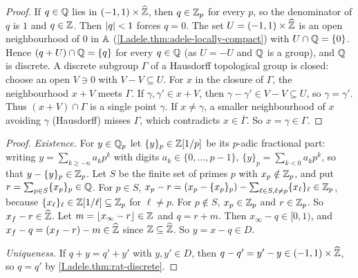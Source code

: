 \begin{theorem}[$\Q$ is discrete in $\A$]
\end{theorem}
\begin{proof}
If $q\in\mathbb{Q}$ lies in $(-1,1)\times\widehat{\mathbb{Z}}$, then $q\in\mathbb{Z}_p$ for every $p$, so the denominator of $q$ is $1$ and $q\in\mathbb{Z}$.
Then $\lvert q\rvert<1$ forces $q=0$. The set $U=(-1,1)\times\widehat{\mathbb{Z}}$ is an open neighbourhood of $0$ in $\A$
(\cref{I.adele.thm:adele-locally-compact}) with $U\cap\mathbb{Q}=\{0\}$. Hence $(q+U)\cap\mathbb{Q}=\{q\}$ for every $q\in\mathbb{Q}$ (as $U=-U$
and $\Q$ is a group), and $\Q$ is discrete. A discrete subgroup $\Gamma$ of a Hausdorff topological group is closed: choose an open
$V\ni0$ with $V-V\subseteq U$. For $x$ in the closure of $\Gamma$, the neighbourhood $x+V$ meets $\Gamma$. If
$\gamma,\gamma'\in x+V$, then $\gamma-\gamma'\in V-V\subseteq U$, so $\gamma=\gamma'$. Thus $(x+V)\cap\Gamma$ is a single
point $\gamma$. If $x\neq\gamma$, a smaller neighbourhood of $x$ avoiding $\gamma$ (Hausdorff) misses $\Gamma$, which
contradicts $x\in\overline\Gamma$. So $x=\gamma\in\Gamma$.
\end{proof}

\begin{theorem}
\end{theorem}
\begin{proof}
\emph{Existence.} For $y\in\mathbb{Q}_p$ let $\{y\}_p\in\mathbb{Z}[1/p]$ be its $p$-adic fractional part: writing $y=\sum_{k\ge-n}a_kp^k$ with digits
$a_k\in\{0,\dots,p-1\}$, $\{y\}_p=\sum_{k<0}a_kp^k$, so that $y-\{y\}_p\in\mathbb{Z}_p$. Let $S$ be the finite set of primes $p$ with $x_p\notin\mathbb{Z}_p$, and put
$r=\sum_{p\in S}\{x_p\}_p\in\mathbb{Q}$. For $p\in S$,
$x_p-r=(x_p-\{x_p\}_p)-\sum_{\ell\in S,\ell\neq p}\{x_\ell\}_\ell\in\mathbb{Z}_p$, because $\{x_\ell\}_\ell\in\mathbb{Z}[1/\ell]\subseteq\mathbb{Z}_p$
for $\ell\neq p$. For $p\notin S$, $x_p\in\mathbb{Z}_p$ and $r\in\mathbb{Z}_p$. So $x_f-r\in\widehat{\mathbb{Z}}$. Let $m=\lfloor x_\infty-r\rfloor\in\mathbb{Z}$
and $q=r+m$. Then $x_\infty-q\in[0,1)$, and $x_f-q=(x_f-r)-m\in\widehat{\mathbb{Z}}$ since $\mathbb{Z}\subseteq\widehat{\mathbb{Z}}$. So $y=x-q\in D$.

\emph{Uniqueness.} If $q+y=q'+y'$ with $y,y'\in D$, then $q-q'=y'-y\in(-1,1)\times\widehat{\mathbb{Z}}$, so $q=q'$ by
\cref{I.adele.thm:rat-discrete}.
\end{proof}

